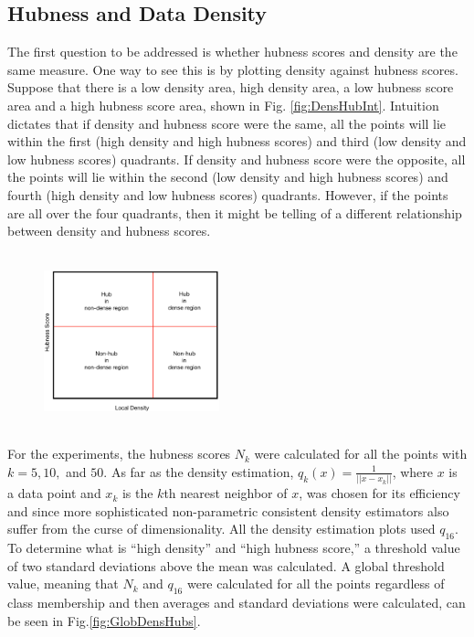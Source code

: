 \documentclass[graybox]{svmult}
\begin{document}
\subsection{Hubness and Data Density}
\label{sec:4.1}

The first question to be addressed is whether hubness scores and density are the same measure. One way to see this is by plotting density against hubness scores. Suppose that there is a low density area, high density area, a low hubness score area and a high hubness score area, shown in Fig. \ref{fig:DensHubInt}. Intuition dictates that if density and hubness score were the same, all the points will lie within the first (high density and high hubness scores) and third (low density and low hubness scores) quadrants. If density and hubness score were the opposite, all the points will lie within the second (low density and high hubness scores) and fourth (high density and low hubness scores) quadrants. However, if the points are all over the four quadrants, then it might be telling of a different relationship between density and hubness scores. 

\begin{figure}
\centering
\includegraphics[width=2in,height=2in]{../fig/DensHub-Intuition.png}
\end{figure}\label{fig:DensHubInt}

For the experiments, the hubness scores $N_k$ were calculated for all the points with $k=5,10,$ and $50$. As far as the density estimation, $q_k(x) = \frac{1}{||x-x_k||}$, where $x$ is a data point and $x_k$ is the $k$th nearest neighbor of $x$, was chosen for its efficiency and since more sophisticated non-parametric consistent density estimators also suffer from the curse of dimensionality. All the density estimation plots used $q_{16}$. To determine what is ``high density'' and ``high hubness score,'' a threshold value of two standard deviations above the mean was calculated. A global threshold value, meaning that $N_k$ and $q_{16}$ were calculated for all the points regardless of class membership and then averages and standard deviations were calculated, can be seen in Fig.\ref{fig:GlobDensHubs}. 
\end{document}
